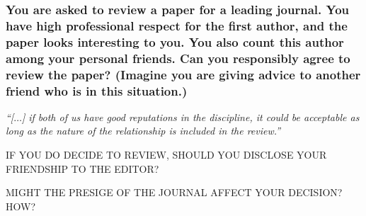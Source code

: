 \documentclass[12pt]{beamer}
\newcommand\ans[1]{{\it ``#1''}}
\newcommand\gap{\vspace{5mm}}
\begin{document}
\begin{frame} %
\frametitle{
You are asked to review a paper for a leading journal. You have high professional respect for the first author, and the paper looks interesting to you. You also count this author among your personal friends. Can you responsibly agree to review the paper? (Imagine you are giving advice to another friend who is in this situation.)
}


\ans{[$\dots$] if both of us have good reputations in the discipline,  it could be acceptable as long as the nature of the relationship is included in the review.}


\gap


\gap

IF YOU DO DECIDE TO REVIEW, SHOULD YOU DISCLOSE YOUR FRIENDSHIP TO THE EDITOR?

\gap

MIGHT THE PRESIGE OF THE JOURNAL AFFECT YOUR DECISION? HOW?




\gap




\end{frame}
\end{document}
